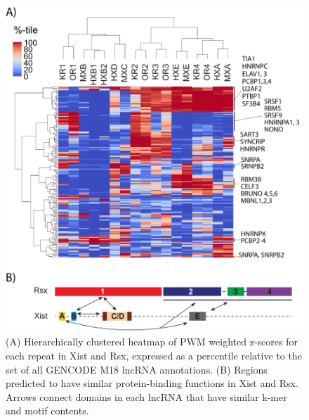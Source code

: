 \begin{figure}[h!]
\centering
\includegraphics[width=.95\textwidth]{images/fig6.pdf}
\caption[Protein-binding motif enrichment in repeats of Xist and Rsx, and similarity model.]{(A) Hierarchically clustered heatmap of PWM weighted z-scores for each repeat in Xist and Rsx, expressed as a percentile relative to the set of all GENCODE M18 lncRNA annotations. (B) Regions predicted to have similar protein-binding functions in Xist and Rsx. Arrows connect domains in each lncRNA that have similar k-mer and motif contents.}
\label{fig:6}
\end{figure}

